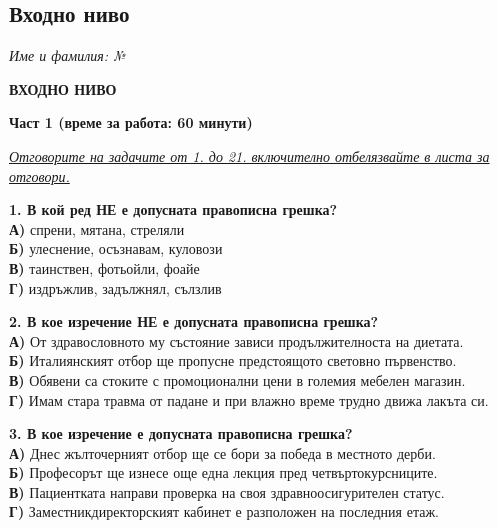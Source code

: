 \documentclass[12pt,a4paper]{article}
\begin{document}
\subsection{Входно ниво}
\noindent
\textit{Име и фамилия:} \dotfill \textit{№} \makebox[2cm]{\dotfill}

\vspace{0.6cm}

\begin{center}
    {\large\bfseries ВХОДНО НИВО}
\end{center}

\vspace{0.6cm}

\noindent
\textbf{Част 1 (време за работа: 60 минути)}

\vspace{0.3cm}

\noindent
\underline{\textit{Отговорите на задачите от 1. до 21. включително отбелязвайте в листа за отговори.}}

\vspace{0.5cm}

\noindent
\textbf{1. В кой ред НЕ е допусната правописна грешка?} \\
\noindent
\textbf{А)} спрени, мятана, стреляли \\
\textbf{Б)} улеснение, осъзнавам, куловози \\
\textbf{В)} таинствен, фотьойли, фоайе \\
\textbf{Г)} издръжлив, задължнял, сълзлив

\vspace{0.6cm}

\noindent
\textbf{2. В кое изречение НЕ е допусната правописна грешка?} \\
\noindent
\textbf{А)} От здравословното му състояние зависи продължителноста на диетата. \\
\textbf{Б)} Италиянският отбор ще пропусне предстоящото световно първенство. \\
\textbf{В)} Обявени са стоките с промоционални цени в големия мебелен магазин. \\
\textbf{Г)} Имам стара травма от падане и при влажно време трудно движа лакъта си.

\vspace{0.6cm}

\noindent
\textbf{3. В кое изречение е допусната правописна грешка?} \\
\noindent
\textbf{А)} Днес жълточерният отбор ще се бори за победа в местното дерби. \\
\textbf{Б)} Професорът ще изнесе още една лекция пред четвъртокурсниците. \\
\textbf{В)} Пациентката направи проверка на своя здравноосигурителен статус. \\
\textbf{Г)} Заместникдиректорският кабинет е разположен на последния етаж.
\end{document}
